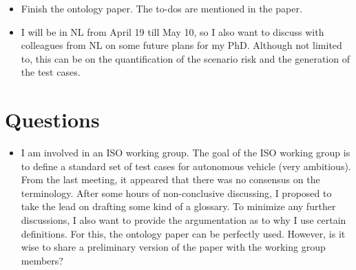 \documentclass[10pt,final,a4paper,oneside,onecolumn]{article}
\begin{document}
\begin{itemize}
	\item Finish the ontology paper. The to-dos are mentioned in the paper.
	\item I will be in NL from April 19 till May 10, so I also want to discuss with colleagues from NL on some future plans for my PhD. Although not limited to, this can be on the quantification of the scenario risk and the generation of the test cases.
\end{itemize}

\section{Questions}

\begin{itemize}
	\item I am involved in an ISO working group. The goal of the ISO working group is to define a standard set of test cases for autonomous vehicle (very ambitious). From the last meeting, it appeared that there was no consensus on the terminology. After some hours of non-conclusive discussing, I proposed to take the lead on drafting some kind of a glossary. To minimize any further discussions, I also want to provide the argumentation as to why I use certain definitions. For this, the ontology paper can be perfectly used. However, is it wise to share a preliminary version of the paper with the working group members?
\end{itemize}


\newpage

\end{document}
